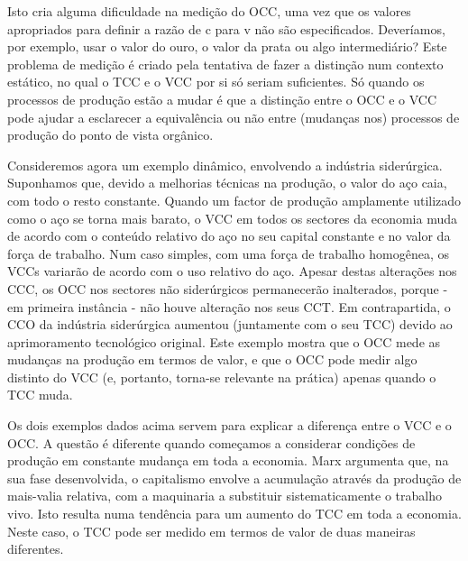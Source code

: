  \par 
Isto cria alguma dificuldade na medição do OCC, uma vez que os valores apropriados para definir a razão de c para v não são especificados. Deveríamos, por exemplo, usar o valor do ouro, o valor da prata ou algo intermediário? Este problema de medição é criado pela tentativa de fazer a distinção num contexto estático, no qual o TCC e o VCC por si só seriam suficientes. Só quando os processos de produção estão a mudar é que a distinção entre o OCC e o VCC pode ajudar a esclarecer a equivalência ou não entre (mudanças nos) processos de produção do ponto de vista orgânico.
 \par 
Consideremos agora um exemplo dinâmico, envolvendo a indústria siderúrgica. Suponhamos que, devido a melhorias técnicas na produção, o valor do aço caia, com todo o resto constante. Quando um factor de produção amplamente utilizado como o aço se torna mais barato, o VCC em todos os sectores da economia muda de acordo com o conteúdo relativo do aço no seu capital constante e no valor da força de trabalho. Num caso simples, com uma força de trabalho homogênea, os VCCs variarão de acordo com o uso relativo do aço. Apesar destas alterações nos CCC, os OCC nos sectores não siderúrgicos permanecerão inalterados, porque - em primeira instância - não houve alteração nos seus CCT. Em contrapartida, o CCO da indústria siderúrgica aumentou (juntamente com o seu TCC) devido ao aprimoramento tecnológico original. Este exemplo mostra que o OCC mede as mudanças na produção em termos de valor, e que o OCC pode medir algo distinto do VCC (e, portanto, torna-se relevante na prática) apenas quando o TCC muda.
 \par 
Os dois exemplos dados acima servem para explicar a diferença entre o VCC e o OCC. A questão é diferente quando começamos a considerar condições de produção em constante mudança em toda a economia. Marx argumenta que, na sua fase desenvolvida, o capitalismo envolve a acumulação através da produção de mais-valia relativa, com a maquinaria a substituir sistematicamente o trabalho vivo. Isto resulta numa tendência para um aumento do TCC em toda a economia. Neste caso, o TCC pode ser medido em termos de valor de duas maneiras diferentes.
 \par 
